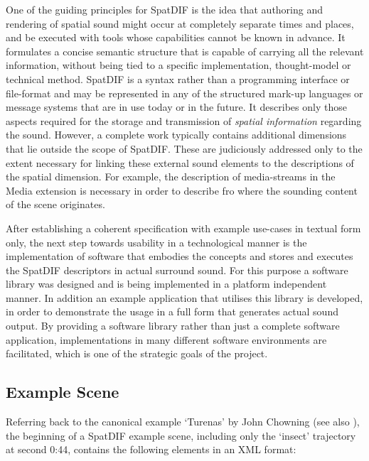 \documentclass[a4paper]{article}
\begin{document}
One of the guiding principles for SpatDIF is the idea that authoring and rendering of spatial sound might occur at completely separate times and places, and be executed with tools whose capabilities cannot be known in advance. 
It formulates a concise semantic structure that is capable of carrying all the relevant information, without being tied to a specific implementation, thought-model or technical method. 
SpatDIF is a syntax rather than a programming interface or file-format and may be represented in any of the structured mark-up languages or message systems that are in use today or in the future. 
It describes only those aspects required for the storage and transmission of \emph{spatial information} regarding the sound.
However, a complete work typically contains additional dimensions that lie outside the scope of SpatDIF. 
These are judiciously addressed only to the extent necessary for linking these external sound elements to the descriptions of the spatial dimension. 
For example, the description of media-streams in the Media extension is necessary in order to describe fro where the sounding content of the scene originates.

After establishing a coherent specification with example use-cases in textual form only, the next step towards usability in a technological manner is the implementation of software that embodies the concepts and stores and executes the SpatDIF descriptors in actual surround sound.
For this purpose a software library was designed and is being implemented in a platform independent manner. 
In addition an example application that utilises this library is developed, in order to demonstrate the usage in a full form that generates actual sound output.
By providing a software library rather than just a complete software application, implementations in many different software environments are facilitated, which is one of the  strategic goals of the project.
 
\subsection{Example Scene}
 
Referring back to the canonical example `Turenas' by John Chowning (see also \cite{Peters:2013SpatDifCMJ}), the beginning of a SpatDIF example scene, including only the `insect' trajectory at second 0:44, contains the following elements in an XML format:

 
\end{document}
